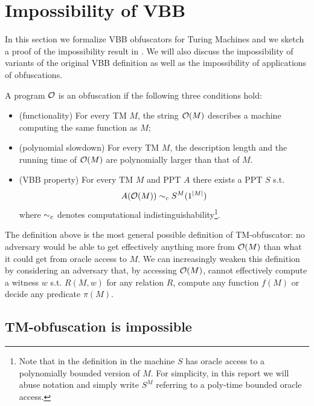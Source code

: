 \section{Impossibility of VBB}
\label{sec:VBB-imp}

In this section we formalize VBB obfuscators for Turing Machines and we sketch a proof of the impossibility result in \cite{VBB-imp}. We will also discuss the impossibility of variants of the original VBB definition as well as the impossibility of applications of obfuscations.

\begin{comment}
In this section:
- definition of VBB
- sketch proof
\end{comment}

\begin{mydef}[TM-obfuscator]
	\label{def:VBB-tm}
	A program $\mathcal{O}$ is an obfuscation if the following three conditions hold: %
	\begin{itemize}
		\item (functionality) For every TM $M$, the string $\mathcal{O}(M)$ describes a machine computing the same function as $M$;
		\item (polynomial slowdown)  For every TM $M$, the description length and the running time of $\mathcal{O}(M)$ are polynomially larger than that of $M$.
		\item (VBB property) For every TM $M$ and PPT $A$ there exists a PPT $S$ s.t. 
		$$ A(\mathcal{O}(M)) \sim_c S^M(1^{|M|}) $$
		where $\sim_c$ denotes computational indistinguishability\footnote{Note that in the definition in \cite{VBB-imp} the machine $S$ has oracle access to a polynomially bounded version of $M$. For simplicity, in this report we will abuse notation and simply write $S^M$ referring to a poly-time bounded oracle access. }.
	\end{itemize}
\end{mydef}

The definition above is the most general possible definition of TM-obfuscator: no adversary would be able to get effectively anything more from $\mathcal{O}(M)$ than what it could get from oracle access to $M$. We can increasingly weaken this definition by considering an adversary that, by accessing $\mathcal{O}(M)$, cannot effectively compute a witness $w$ s.t. $R(M,w)$ for any relation $R$, compute any function $f(M)$ or decide any predicate $\pi(M)$.



\subsection{TM-obfuscation is impossible}

